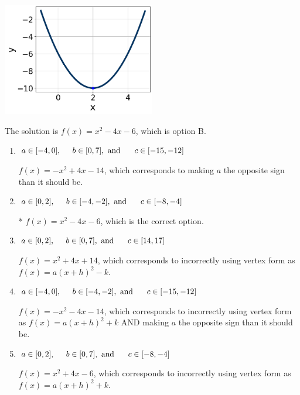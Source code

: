 \documentclass{extbook}[14pt]
\begin{document}
\begin{enumerate}
{\begin{center}
    \includegraphics[width=0.5\textwidth]{../Figures/quadraticGraphToEquationB.png}
\end{center}


The solution is \( f(x) = x^{2} -4 x -6 \), which is option B.\begin{enumerate}[label=\Alph*.]
\item \( a \in [-4, 0], \hspace*{5mm} b \in [0, 7], \text{ and } \hspace*{5mm} c \in [-15, -12] \)

$f(x)=-x^{2} +4 x -14$, which corresponds to making $a$ the opposite sign than it should be.
\item \( a \in [0, 2], \hspace*{5mm} b \in [-4, -2], \text{ and } \hspace*{5mm} c \in [-8, -4] \)

* $f(x)=x^{2} -4 x -6$, which is the correct option.
\item \( a \in [0, 2], \hspace*{5mm} b \in [0, 7], \text{ and } \hspace*{5mm} c \in [14, 17] \)

$f(x)=x^{2} +4 x + 14$, which corresponds to incorrectly using vertex form as $f(x) = a(x+h)^2 - k$.
\item \( a \in [-4, 0], \hspace*{5mm} b \in [-4, -2], \text{ and } \hspace*{5mm} c \in [-15, -12] \)

$f(x)=-x^{2} -4 x -14$, which corresponds to incorrectly using vertex form as $f(x) = a(x+h)^2+k$ AND making $a$ the opposite sign than it should be.
\item \( a \in [0, 2], \hspace*{5mm} b \in [0, 7], \text{ and } \hspace*{5mm} c \in [-8, -4] \)

$f(x)=x^{2} +4 x -6$, which corresponds to incorrectly using vertex form as $f(x) = a(x+h)^2+k$.
\end{enumerate}

}
\end{enumerate}
\end{document}

